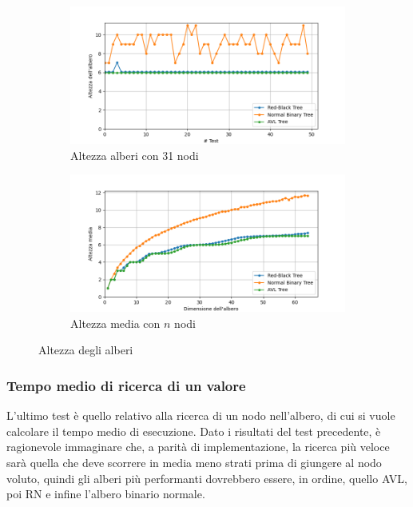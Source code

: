 \documentclass[a4paper,12pt]{article}
\begin{document}
    \begin{figure}[htb!]
        \centering
        \begin{subfigure}{0.49\textwidth}
            \includegraphics[width=\linewidth]{Altezza alberi}
            \caption{Altezza alberi con 31 nodi}
        \end{subfigure}
        \hfill
        \begin{subfigure}{0.49\textwidth}
            \includegraphics[width=\linewidth]{Altezza media}
            \caption{Altezza media con $n$ nodi}
        \end{subfigure}
        \caption{Altezza degli alberi}
    \end{figure}

    \subsubsection{Tempo medio di ricerca di un valore}
    L'ultimo test è quello relativo alla ricerca di un nodo nell'albero, di cui si vuole calcolare il tempo medio di
    esecuzione. Dato i risultati del test precedente, è ragionevole immaginare che, a parità di implementazione,
    la ricerca più veloce sarà quella che deve scorrere in media meno strati prima di giungere al nodo voluto,
    quindi gli alberi più performanti dovrebbero essere, in ordine, quello AVL, poi RN e infine l'albero binario
    normale.
\end{document}
